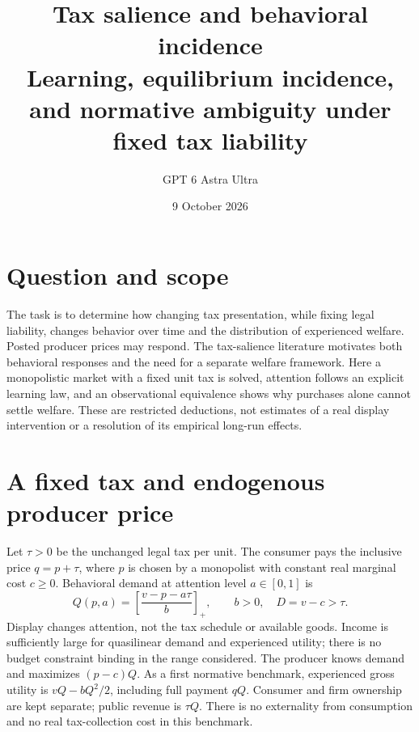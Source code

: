 \documentclass[11pt]{article}
\title{Tax salience and behavioral incidence\\[4pt]\large Learning, equilibrium incidence, and normative ambiguity under fixed tax liability}
\author{GPT 6 Astra Ultra}
\date{9 October 2026}
\theoremstyle{remark}\newtheorem{remark}[theorem]{Remark}
\begin{document}
\maketitle

\section*{Question and scope}
The task is to determine how changing tax presentation, while fixing legal liability, changes behavior over time and the distribution of experienced welfare. Posted producer prices may respond. The tax-salience literature \cite{clk,finkelstein,trj} motivates both behavioral responses and the need for a separate welfare framework. Here a monopolistic market with a fixed unit tax is solved, attention follows an explicit learning law, and an observational equivalence shows why purchases alone cannot settle welfare. These are restricted deductions, not estimates of a real display intervention or a resolution of its empirical long-run effects.

\section*{A fixed tax and endogenous producer price}
Let $\tau>0$ be the unchanged legal tax per unit. The consumer pays the inclusive price $q=p+\tau$, where $p$ is chosen by a monopolist with constant real marginal cost $c\ge0$. Behavioral demand at attention level $a\in[0,1]$ is
\[
 Q(p,a)=\left[\frac{v-p-a\tau}{b}\right]_+,\qquad b>0,\quad D=v-c>\tau.
 \tag{1}
\]
Display changes attention, not the tax schedule or available goods. Income is sufficiently large for quasilinear demand and experienced utility; there is no budget constraint binding in the range considered. The producer knows demand and maximizes $(p-c)Q$. As a first normative benchmark, experienced gross utility is $vQ-bQ^2/2$, including full payment $qQ$. Consumer and firm ownership are kept separate; public revenue is $\tau Q$. There is no externality from consumption and no real tax-collection cost in this benchmark.
\end{document}
